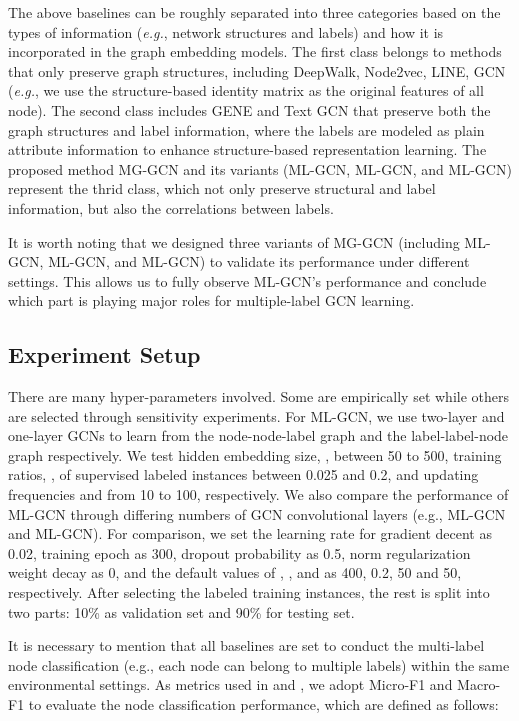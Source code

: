 \documentclass[conference]{IEEEtran}
\begin{document}
The above baselines can be roughly separated into three categories based on the types of information (\textit{e.g.}, network structures and labels) and how it is incorporated in the graph embedding models. The first class belongs to methods that only preserve graph structures, including DeepWalk, Node2vec, LINE, GCN (\textit{e.g.}, we use the structure-based identity matrix as the original features of all node). The second class includes GENE and Text GCN that preserve both the graph structures and label information, where the labels are modeled as plain attribute information to enhance structure-based representation learning. The proposed method MG-GCN and its variants (ML-GCN, ML-GCN, and ML-GCN) represent the thrid class, which not only preserve structural and label information, but also the correlations between labels. 

It is worth noting that we designed three variants of MG-GCN (including ML-GCN, ML-GCN, and ML-GCN) to validate its performance under different settings. This allows us to fully observe ML-GCN's performance and conclude which part is playing major roles for multiple-label GCN learning. 

\subsection{Experiment Setup}

There are many hyper-parameters involved. Some are empirically set \cite{25} while others are selected through sensitivity experiments. For ML-GCN, we use two-layer and one-layer GCNs to learn from the node-node-label graph and the label-label-node graph respectively. We test hidden embedding size, , between 50 to 500, training ratios, , of supervised labeled instances between 0.025 and 0.2, and updating frequencies  and  from 10 to 100, respectively. We also compare the performance of ML-GCN through differing numbers of GCN convolutional layers (e.g., ML-GCN and ML-GCN). For comparison, we set the learning rate  for gradient decent as 0.02, training epoch as 300, dropout probability as 0.5,  norm regularization weight decay as 0, and the default values of , ,  and  as 400, 0.2, 50 and 50, respectively. After selecting the labeled training instances, the rest is split into two parts: 10\% as validation set and 90\% for testing set.

It is necessary to mention that all baselines are set to conduct the multi-label node classification (e.g., each node can belong to multiple labels) within the same environmental settings. As metrics used in \cite{21} and \cite{23}, we adopt Micro-F1 and Macro-F1 to evaluate the node classification performance, which are defined as follows:
\end{document}

